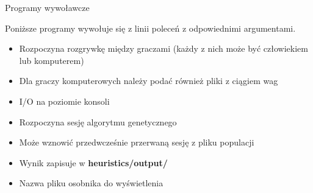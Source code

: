 \begin{frame}{Programy wywoławcze}

	Poniższe programy wywołuje się z linii poleceń z odpowiednimi argumentami.

	\begin{itemize}
		\begin{itemize}
			\item Rozpoczyna rozgrywkę między graczami (każdy z nich może być człowiekiem lub komputerem)
			\item Dla graczy komputerowych należy podać również pliki z ciągiem wag
			\item I/O na poziomie konsoli
		\end{itemize}
		\begin{itemize}
			\item Rozpoczyna sesję algorytmu genetycznego
			\item Może wznowić przedwcześnie przerwaną sesję z pliku populacji
			\item Wynik zapisuje w \textbf{heuristics/output/}
		\end{itemize}
		\begin{itemize}
			\item Nazwa pliku osobnika do wyświetlenia
		\end{itemize}
	\end{itemize}





\end{frame}
